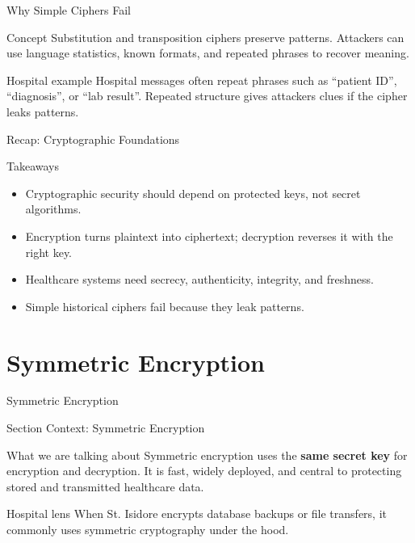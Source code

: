 \documentclass[presentation]{beamer}
\newcommand{\sectiontitleframe}[1]{
\begin{frame}[plain,c]
\begin{center}
{\usebeamerfont{title}\usebeamercolor[fg]{title}#1}
\end{center}
\end{frame}
}
\begin{document}
\begin{frame}[c]{Why Simple Ciphers Fail}
\begin{block}{Concept}
Substitution and transposition ciphers preserve patterns. Attackers can use language statistics,
known formats, and repeated phrases to recover meaning.
\end{block}

\begin{exampleblock}{Hospital example}
Hospital messages often repeat phrases such as ``patient ID'', ``diagnosis'', or ``lab result''.
Repeated structure gives attackers clues if the cipher leaks patterns.
\end{exampleblock}
\end{frame}

\begin{frame}[c]{Recap: Cryptographic Foundations}
\begin{block}{Takeaways}
\begin{itemize}
    \item Cryptographic security should depend on protected keys, not secret algorithms.
    \item Encryption turns plaintext into ciphertext; decryption reverses it with the right key.
    \item Healthcare systems need secrecy, authenticity, integrity, and freshness.
    \item Simple historical ciphers fail because they leak patterns.
\end{itemize}
\end{block}
\end{frame}

\section{Symmetric Encryption}
\sectiontitleframe{Symmetric Encryption}

\begin{frame}[c]{Section Context: Symmetric Encryption}
\begin{block}{What we are talking about}
Symmetric encryption uses the \textbf{same secret key} for encryption and decryption. It is fast,
widely deployed, and central to protecting stored and transmitted healthcare data.
\end{block}

\begin{exampleblock}{Hospital lens}
When St. Isidore encrypts database backups or file transfers, it commonly uses symmetric
cryptography under the hood.
\end{exampleblock}
\end{frame}
\end{document}

